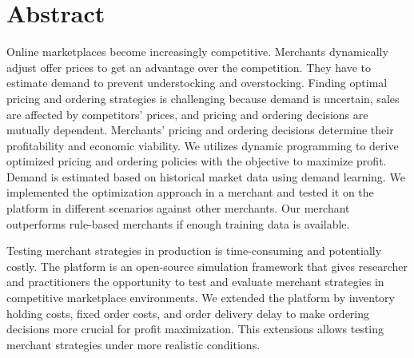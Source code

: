 \chapter*{Abstract}
Online marketplaces become increasingly competitive.
Merchants dynamically adjust offer prices to get an advantage over the competition.
They have to estimate demand to prevent understocking and overstocking.
Finding optimal pricing and ordering strategies is challenging because demand is uncertain, sales are affected by competitors' prices, and pricing and ordering decisions are mutually dependent.
Merchants' pricing and ordering decisions determine their profitability and economic viability.
We utilizes dynamic programming to derive optimized pricing and ordering policies with the objective to maximize profit.
Demand is estimated based on historical market data using demand learning.
We implemented the optimization approach in a merchant and tested it on the \pricewars platform in different scenarios against other merchants.
Our merchant outperforms rule-based merchants if enough training data is available.

Testing merchant strategies in production is time-consuming and potentially costly.
The \pricewars platform is an open-source simulation framework that gives researcher and practitioners the opportunity to test and evaluate merchant strategies in competitive marketplace environments.
We extended the platform by inventory holding costs, fixed order costs, and order delivery delay to make ordering decisions more crucial for profit maximization.
This extensions allows testing merchant strategies under more realistic conditions.